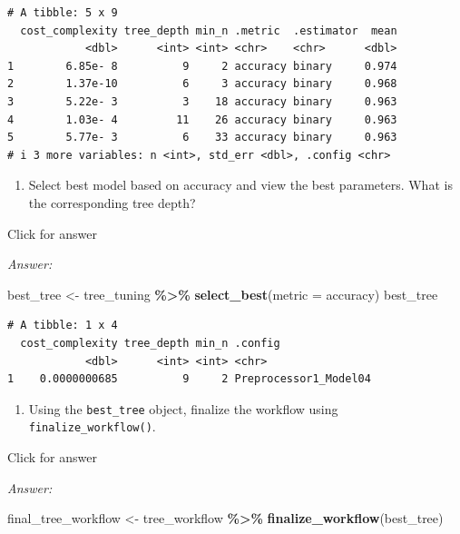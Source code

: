 \documentclass[
]{book}
\newenvironment{Shaded}{\begin{snugshade}}{\end{snugshade}}
\newcommand{\AttributeTok}[1]{\textcolor[rgb]{0.13,0.29,0.53}{#1}}
\newcommand{\FunctionTok}[1]{\textcolor[rgb]{0.13,0.29,0.53}{\textbf{#1}}}
\newcommand{\NormalTok}[1]{#1}
\newcommand{\OtherTok}[1]{\textcolor[rgb]{0.56,0.35,0.01}{#1}}
\newcommand{\SpecialCharTok}[1]{\textcolor[rgb]{0.81,0.36,0.00}{\textbf{#1}}}
\newcommand{\StringTok}[1]{\textcolor[rgb]{0.31,0.60,0.02}{#1}}
\providecommand{\tightlist}{%
  \setlength{\itemsep}{0pt}\setlength{\parskip}{0pt}}
\begin{document}
\begin{verbatim}
# A tibble: 5 x 9
  cost_complexity tree_depth min_n .metric  .estimator  mean
            <dbl>      <int> <int> <chr>    <chr>      <dbl>
1        6.85e- 8          9     2 accuracy binary     0.974
2        1.37e-10          6     3 accuracy binary     0.968
3        5.22e- 3          3    18 accuracy binary     0.963
4        1.03e- 4         11    26 accuracy binary     0.963
5        5.77e- 3          6    33 accuracy binary     0.963
# i 3 more variables: n <int>, std_err <dbl>, .config <chr>
\end{verbatim}

\begin{enumerate}
\def\labelenumi{\alph{enumi}.}
\setcounter{enumi}{6}
\tightlist
\item
  Select best model based on accuracy and view the best parameters. What is the corresponding tree depth?
\end{enumerate}

Click for answer

\emph{Answer:}

\begin{Shaded}
\begin{Highlighting}[]
\NormalTok{best\_tree }\OtherTok{\textless{}{-}}\NormalTok{ tree\_tuning }\SpecialCharTok{\%\textgreater{}\%}  \FunctionTok{select\_best}\NormalTok{(}\AttributeTok{metric =} \StringTok{\textquotesingle{}accuracy\textquotesingle{}}\NormalTok{)}
\NormalTok{best\_tree}
\end{Highlighting}
\end{Shaded}

\begin{verbatim}
# A tibble: 1 x 4
  cost_complexity tree_depth min_n .config              
            <dbl>      <int> <int> <chr>                
1    0.0000000685          9     2 Preprocessor1_Model04
\end{verbatim}

\begin{enumerate}
\def\labelenumi{\alph{enumi}.}
\setcounter{enumi}{7}
\tightlist
\item
  Using the \texttt{best\_tree} object, finalize the workflow using \texttt{finalize\_workflow()}.
\end{enumerate}

Click for answer

\emph{Answer:}

\begin{Shaded}
\begin{Highlighting}[]
\NormalTok{final\_tree\_workflow }\OtherTok{\textless{}{-}}\NormalTok{ tree\_workflow }\SpecialCharTok{\%\textgreater{}\%} \FunctionTok{finalize\_workflow}\NormalTok{(best\_tree)}
\end{Highlighting}
\end{Shaded}
\end{document}
